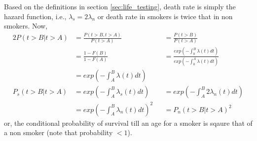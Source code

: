 \documentclass[../../probability-notes.tex]{subfiles}
\begin{document}
    Based on the definitions in section \ref{sec:life_testing}, death rate is simply the hazard function, i.e., $\lambda_{s} = 2 \lambda_{n}$ or death rate in smokers is twice that in non smokers. Now,
    \begin{alignat*}{2}
        P(t > B | t > A) &= \frac{P(t>B, t>A)}{P(t>A)} &&= \frac{P(t>B)}{P(t>A)}\\
        &= \frac{1 - F(B)}{1 - F(A)} &&= \frac{exp(-\int_{0}^{B} \lambda(t) dt)}{exp(-\int_{0}^{A} \lambda(t) dt)}\\
        &= exp(-\int_{A}^{B} \lambda(t) dt)\\
        P_{s}(t > B | t > A) &= exp(-\int_{A}^{B} \lambda_{s}(t) dt) &&= exp(-\int_{A}^{B} 2\lambda_{n}(t) dt)\\
        &= exp(-\int_{A}^{B} \lambda_{n}(t) dt)^{2} &&= P_{n}(t > B | t > A)^{2}
    \end{alignat*}
    or, the conditional probability of survival till an age for a smoker is sqaure that of a non smoker (note that probability $< 1$).
\end{document}
